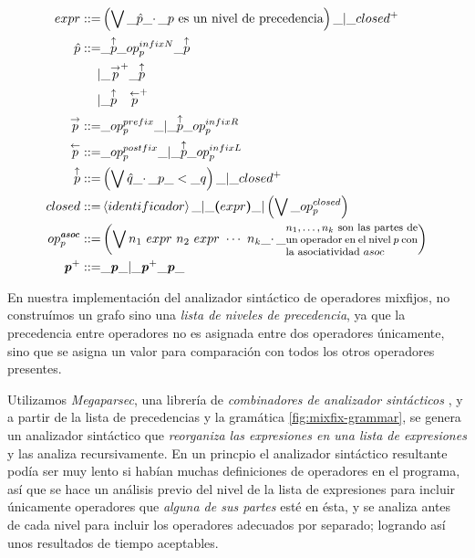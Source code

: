 {\begin{investigationfr}
{\allowdisplaybreaks
\footnotesize
\begin{align*}
expr ::=
    & \left( \bigvee \_ \hat{p} \_ \cdotp \_
        \text{$p$ es un nivel de precedencia} \right) \_
    | \_ closed^{+}
\\
\hat{p} ::=
     & \_ \overp{\uparrow} \_ op_p^{infixN} \_ \overp{\uparrow} \\
    |& \_ \overp{\rightarrow}^{+} \_ \overp{\uparrow} \\
    |& \_ \overp{\uparrow}\quad \overp{\leftarrow}^{+}
\\
\overp{\rightarrow} ::=
    & \_ op_p^{prefix} \_
    | \_ \overp{\uparrow} \_ op_p^{infixR}
\\
\overp{\leftarrow} ::=
    & \_ op_p^{postfix} \_
    | \_ \overp{\uparrow} \_ op_p^{infixL}
\\
\overp{\uparrow} ::=
    & \left( \bigvee \hat{q} \_ \cdotp \_ p \_ < \_ q \right) \_
    | \_ closed^{+}
\\
closed ::=
    & \left<identificador\right> \_
    | \_ \boldsymbol{(} expr \boldsymbol{)} \_
    | \left( \bigvee \_ op_p^{closed} \right)
\\
op_p^{\emph{asoc}} ::=
    & \left( \bigvee n_1\ expr\ n_2\ expr\ \cdots\ n_k \_ \cdotp \_
        \parbox{0.3\textwidth}{\footnotesize$n_1,\ldots,n_k$ son las partes de un operador en el nivel $p$ con la asociatividad $asoc$} \right)
\\
\emph{p}^{+} ::=
    & \_ \emph{p} \_
    | \_ \emph{p}^{+} \_ \emph{p} \_
\end{align*}
\label{fig:mixfix-grammar}
}
\end{investigationfr}

\begin{implementationfr}
En nuestra implementación del analizador sintáctico de operadores mixfijos, no construímos un grafo sino una \emph{lista de niveles de precedencia}, ya que la precedencia entre operadores no es asignada entre dos operadores únicamente, sino que se asigna un valor para comparación con todos los otros operadores presentes.

Utilizamos \emph{Megaparsec}, una librería de \emph{combinadores de analizador sintácticos} \cite{megaparsec}, y a partir de la lista de precedencias y la gramática \ref{fig:mixfix-grammar}, se genera un analizador sintáctico que \emph{reorganiza las expresiones en una lista de expresiones} y las analiza recursivamente. En un princpio el analizador sintáctico resultante podía ser muy lento si habían muchas definiciones de operadores en el programa, así que se hace un análisis previo del nivel de la lista de expresiones para incluir únicamente operadores que \emph{alguna de sus partes} esté en ésta, y se analiza antes de cada nivel para incluir los operadores adecuados por separado; logrando así unos resultados de tiempo aceptables.
\end{implementationfr}

}
